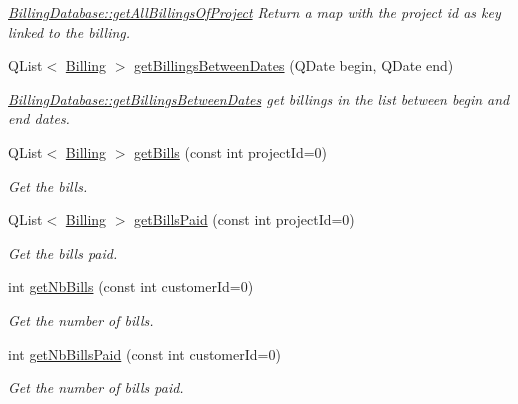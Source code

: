 \begin{DoxyCompactItemize}
\begin{DoxyCompactList}\small\item\em \hyperlink{classDatabases_1_1BillingDatabase_a44c3e09fbb7d540579f4cceae4d6901f}{Billing\-Database\-::get\-All\-Billings\-Of\-Project} Return a map with the project id as key linked to the billing. \end{DoxyCompactList}\item 
Q\-List$<$ \hyperlink{classModels_1_1Billing}{Billing} $>$ \hyperlink{classDatabases_1_1BillingDatabase_a062336da6fc0e3c7af4396fccd4025ee}{get\-Billings\-Between\-Dates} (Q\-Date begin, Q\-Date end)
\begin{DoxyCompactList}\small\item\em \hyperlink{classDatabases_1_1BillingDatabase_a062336da6fc0e3c7af4396fccd4025ee}{Billing\-Database\-::get\-Billings\-Between\-Dates} get billings in the list between {\itshape begin} and {\itshape end} dates. \end{DoxyCompactList}\item 
Q\-List$<$ \hyperlink{classModels_1_1Billing}{Billing} $>$ \hyperlink{classDatabases_1_1BillingDatabase_af94468bf6fef5f076bad1d6df4fae887}{get\-Bills} (const int project\-Id=0)
\begin{DoxyCompactList}\small\item\em Get the bills. \end{DoxyCompactList}\item 
Q\-List$<$ \hyperlink{classModels_1_1Billing}{Billing} $>$ \hyperlink{classDatabases_1_1BillingDatabase_a86491627f6a9d610e62832fd6cbdc0bb}{get\-Bills\-Paid} (const int project\-Id=0)
\begin{DoxyCompactList}\small\item\em Get the bills paid. \end{DoxyCompactList}\item 
int \hyperlink{classDatabases_1_1BillingDatabase_af173470dd295561e6b1e667cfbba31a6}{get\-Nb\-Bills} (const int customer\-Id=0)
\begin{DoxyCompactList}\small\item\em Get the number of bills. \end{DoxyCompactList}\item 
int \hyperlink{classDatabases_1_1BillingDatabase_a5a0b207606dd48fcc31d5b503146bbfa}{get\-Nb\-Bills\-Paid} (const int customer\-Id=0)
\begin{DoxyCompactList}\small\item\em Get the number of bills paid. \end{DoxyCompactList}\item 

\end{DoxyCompactItemize}
